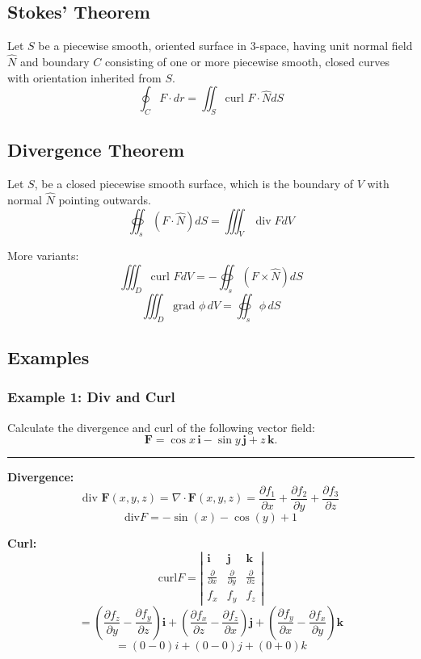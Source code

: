 \subsection{Stokes' Theorem}
Let $S$ be a piecewise smooth, oriented surface in 3-space, having unit normal field $\widehat{N}$ and boundary $C$ consisting of one or more piecewise smooth, closed curves with orientation inherited from $S$.
$$\oint_{C}F\cdot dr=\iint_{S}\text{curl }F\cdot\widehat{N}dS$$

\subsection{Divergence Theorem}
Let $S$, be a closed piecewise smooth surface, which is the boundary of $V$ with normal $\widehat{N}$ pointing outwards.
$$\oiint_{s}(F \cdot \widehat{N}) d S=\iiint_V \operatorname{div} F d V$$

More variants:
$$\iiint_{D}\text{curl }FdV=-\oiint_{s}(F \times\widehat{N})dS$$
$$\iiint_{D}\text{grad }\phi \,dV=\oiint_{s}\phi \,dS$$

\subsection{Examples}
\subsubsection{Example 1: Div and Curl}
Calculate the divergence and curl of the following vector field:
$$\mathbf{F}=\cos x\,\mathbf{i}-\sin y\,\mathbf{j}+z\,\mathbf{k}.$$

\rule{\textwidth}{0.5pt}

\textbf{Divergence:}
$$\text{div }\mathbf{F}(x,y,z)=\nabla \cdot \mathbf{F}(x,y,z)=\frac{ \partial f_{1} }{ \partial x } +\frac{ \partial f_{2} }{ \partial y } +\frac{ \partial f_{3} }{ \partial z } $$
$$\text{div}F=-\sin(x)-\cos(y)+1$$

\textbf{Curl:}
$$\text{curl}F=\left|\begin{array}{ccc}\mathbf{i} & \mathbf{j} & \mathbf{k} \\ \frac{ \partial  }{ \partial x } & \frac{ \partial  }{ \partial y } & \frac{ \partial  }{ \partial z } \\ f_{x} & f_{y} & f_{z} \end{array}\right|$$
$$=\left(\frac{ \partial f_{z} }{ \partial y } -\frac{ \partial f_{y} }{ \partial z } \right)\mathbf{i}+\left(\frac{ \partial f_{x} }{ \partial z } -\frac{ \partial f_{z} }{ \partial x } \right)\mathbf{j}+\left(\frac{ \partial f_{y} }{ \partial x } -\frac{ \partial f_{x} }{ \partial y } \right)\mathbf{k}$$
$$=(0-0)i+(0-0)j+(0+0)k$$
